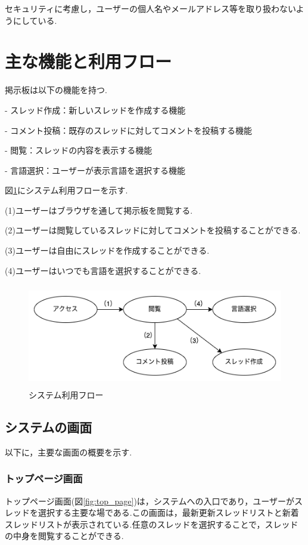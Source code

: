 \documentclass[b5paper,12pt,dvipdfmx]{jsreport}
\begin{document}
セキュリティに考慮し，ユーザーの個人名やメールアドレス等を取り扱わないようにしている.


\section{主な機能と利用フロー}

掲示板は以下の機能を持つ.

- スレッド作成：新しいスレッドを作成する機能

- コメント投稿：既存のスレッドに対してコメントを投稿する機能

- 閲覧：スレッドの内容を表示する機能

- 言語選択：ユーザーが表示言語を選択する機能

図\ref{system_usage_flow}にシステム利用フローを示す.

(1)ユーザーはブラウザを通して掲示板を閲覧する.

(2)ユーザーは閲覧しているスレッドに対してコメントを投稿することができる.

(3)ユーザーは自由にスレッドを作成することができる.

(4)ユーザーはいつでも言語を選択することができる.

\begin{figure}[H]
	\centering
	\includegraphics[width=124mm,height=45mm]{img/system_usage_flow.png}
	\caption{システム利用フロー}
    \label{system_usage_flow}
\end{figure}


\subsection{システムの画面}

以下に，主要な画面の概要を示す.


\subsubsection{トップページ画面}
トップページ画面(図\ref{fig:top_page})は，システムへの入口であり，ユーザーがスレッドを選択する主要な場である.この画面は，最新更新スレッドリストと新着スレッドリストが表示されている.任意のスレッドを選択することで，スレッドの中身を閲覧することができる.
\end{document}
